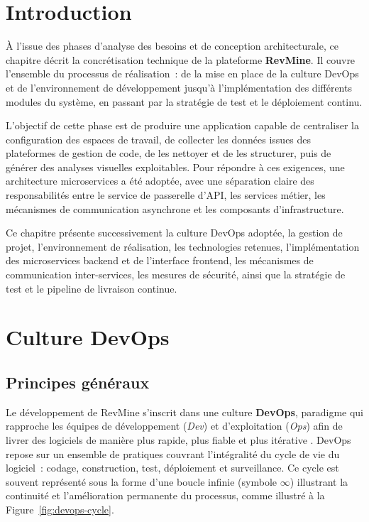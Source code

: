 
\section{Introduction}

À l'issue des phases d'analyse des besoins et de conception architecturale, ce chapitre décrit
la concrétisation technique de la plateforme \textbf{RevMine}. Il couvre l'ensemble du processus
de réalisation~: de la mise en place de la culture DevOps et de l'environnement de développement
jusqu'à l'implémentation des différents modules du système, en passant par la stratégie de test
et le déploiement continu.

L'objectif de cette phase est de produire une application capable de centraliser la configuration
des espaces de travail, de collecter les données issues des plateformes de gestion de code, de les
nettoyer et de les structurer, puis de générer des analyses visuelles exploitables. Pour répondre
à ces exigences, une architecture microservices a été adoptée, avec une séparation claire des
responsabilités entre le service de passerelle d'API, les services métier, les mécanismes de
communication asynchrone et les composants d'infrastructure.

Ce chapitre présente successivement la culture DevOps adoptée, la gestion de projet,
l'environnement de réalisation, les technologies retenues, l'implémentation des microservices
backend et de l'interface frontend, les mécanismes de communication inter-services, les mesures
de sécurité, ainsi que la stratégie de test et le pipeline de livraison continue.

\section{Culture DevOps}

\subsection{Principes généraux}

Le développement de RevMine s'inscrit dans une culture \textbf{DevOps}, paradigme qui rapproche
les équipes de développement (\textit{Dev}) et d'exploitation (\textit{Ops}) afin de livrer des
logiciels de manière plus rapide, plus fiable et plus itérative \parencite{bass2015devops}. DevOps
repose sur un ensemble de pratiques couvrant l'intégralité du cycle de vie du logiciel~: codage,
construction, test, déploiement et surveillance. Ce cycle est souvent représenté sous la forme
d'une boucle infinie (symbole $\infty$) illustrant la continuité et l'amélioration permanente du
processus, comme illustré à la Figure~\ref{fig:devops-cycle}.

